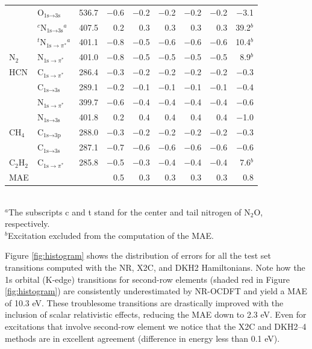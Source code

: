 \documentclass{article}
\begin{document}
\begin{table}[t!]
\begin{tabular}{lllrrrrrr}
		 & O$_{\text{1s}\rightarrow\text{3s}}$ & 536.7 & $-$0.6 & $-$0.2 & $-$0.2 & $-$0.2 & $-$0.2 & $-$3.1 \\
		 & $^c$N$_{\text{1s}\rightarrow\text{3s}}$$^{a}$ & 407.5 & 0.2 & 0.3 & 0.3 & 0.3 & 0.3 & 39.2$^{b}$ \\
		 & $^t$N$_{\text{1s}\rightarrow\pi^*}$$^{a}$ & 401.1 & $-$0.8 & $-$0.5 & $-$0.6 & $-$0.6 & $-$0.6 & 10.4$^{b}$ \\
N$_2$	 & N$_{\text{1s}\rightarrow\pi^*}$ & 401.0 & $-$0.8 & $-$0.5 & $-$0.5 & $-$0.5 & $-$0.5 & 8.9$^{b}$ \\
HCN 	& C$_{\text{1s}\rightarrow\pi^*}$ & 286.4 & $-$0.3 & $-$0.2 & $-$0.2 & $-$0.2 & $-$0.2 & $-$0.3 \\
		 & C$_{\text{1s}\rightarrow\text{3s}}$ & 289.1 & $-$0.2 & $-$0.1 & $-$0.1 & $-$0.1 & $-$0.1 & $-$0.4 \\
		 & N$_{\text{1s}\rightarrow\pi^*}$ & 399.7 & $-$0.6 & $-$0.4 & $-$0.4 & $-$0.4 & $-$0.4 & $-$0.6 \\
		 & N$_{\text{1s}\rightarrow\text{3s}}$ & 401.8 & 0.2 & 0.4 & 0.4 & 0.4 & 0.4 & $-$1.0 \\
CH$_4$	   & C$_{\text{1s}\rightarrow\text{3p}}$ & 288.0 & $-$0.3 & $-$0.2 & $-$0.2 & $-$0.2 & $-$0.2 & $-$0.3 \\
           & C$_{\text{1s}\rightarrow\text{3s}}$ & 287.1 & $-$0.7 & $-$0.6 & $-$0.6 & $-$0.6 & $-$0.6 & $-$0.6 \\
C$_2$H$_2$ & C$_{\text{1s}\rightarrow\pi^*}$ & 285.8 & $-$0.5 & $-$0.3 & $-$0.4 & $-$0.4 & $-$0.4 & 7.6$^{b}$ \\[3pt]
MAE       & &  & 0.5  & 0.3 & 0.3 & 0.3 & 0.3 & 0.8 \\	
\bottomrule		
	\end{tabular}\\	
	$^{a}$The subscripts c and t stand for the center and tail nitrogen of N$_2$O, respectively.\\
	$^{b}$Excitation excluded from the computation of the MAE.
	\label{table:FirstRow}
\end{table}

Figure \ref{fig:histogram} shows the distribution of errors for all the test set transitions computed with the NR, X2C, and DKH2 Hamiltonians.
Note how the 1s orbital (K-edge) transitions for second-row elements (shaded red in Figure \ref{fig:histogram}) are consistently underestimated by NR-OCDFT and yield a MAE of 10.3 eV.
These troublesome transitions are drastically improved with the inclusion of scalar relativistic effects, reducing the MAE down to 2.3 eV.
Even for excitations that involve second-row element we notice that the X2C and DKH2--4 methods are in excellent agreement (difference in energy less than 0.1 eV).
\end{document}
